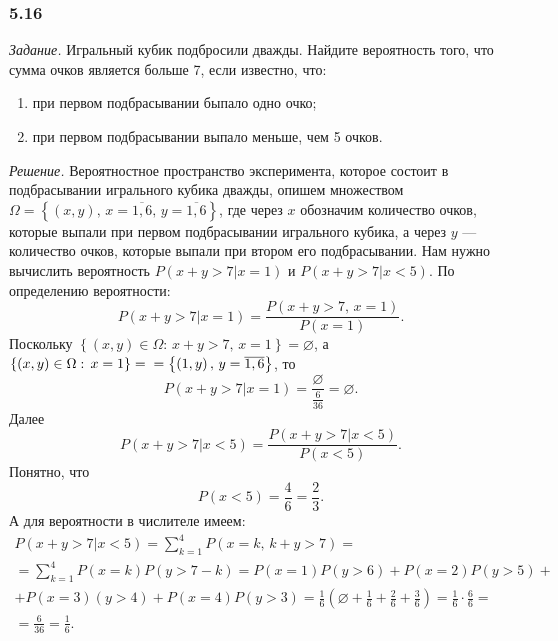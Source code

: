 \subsubsection*{5.16}

\textit{Задание.} Игральный кубик подбросили дважды.
Найдите вероятность того, что сумма очков является больше 7, если известно, что:

\begin{enumerate}[label=\alph*)]
\item при первом подбрасывании быпало одно очко;
\item при первом подбрасывании выпало меньше, чем 5 очков.
\end{enumerate}

\textit{Решение.}
Вероятностное пространство эксперимента,
которое состоит в подбрасывании игрального кубика дважды,
опишем множеством
$ \Omega =
\left\{ \left( x, y \right), \, x = \overline{1, 6}, \, y = \overline{1, 6} \right\} $,
где через $x$ обозначим количество очков,
которые выпали при первом подбрасывании игрального кубика, а через $y$ --- количество очков, которые выпали при втором его подбрасывании.
Нам нужно вычислить вероятность $P \left( \left. x+y>7 \right| x=1 \right) $ и $P \left( \left. x+y>7 \right| x<5 \right) $.
По определению вероятности:
$$P \left( \left. x+y>7 \right| x=1 \right) =
\frac{P \left( x+y>7, \, x=1 \right) }{P \left( x=1 \right) }.$$
Поскольку
$ \left\{ \left( x, y \right) \in \Omega: \, x + y > 7, \, x = 1 \right\} =
\varnothing $,
а $ \left\{ \left( x, y \right) \in \Omega: \, x = 1 \right\} =  \\ = \left\{ \left( 1, y \right), \, y = \overline{1, 6} \right\} $, то
$$P \left( \left. x+y>7 \right| x=1 \right) =
\frac{ \varnothing }{ \frac{6}{36} } =
\varnothing.$$
Далее
$$P \left( \left. x+y>7 \right| x<5 \right) =
\frac{P \left( \left. x+y>7 \right| x<5 \right) }{P \left( x<5 \right) }.$$
Понятно, что
$$P \left( x<5 \right) =
\frac{4}{6} =
\frac{2}{3}.$$
А для вероятности в числителе имеем:
\begin{equation*}
\begin{split}
P \left( \left. x+y>7 \right| x<5 \right) =
\sum \limits_{k=1}^4 P \left(x=k, \, k+y>7 \right) = \\
= \sum \limits_{k=1}^4 P \left( x=k \right) P \left( y>7-k \right) =
P \left( x=1 \right) P \left( y>6 \right) +
P \left( x=2 \right) P \left( y>5 \right) + \\
+ P \left( x=3 \right) \left( y>4 \right) +
P \left( x=4 \right) P \left( y>3 \right) =
\frac{1}{6} \left(\varnothing +\frac{1}{6} + \frac{2}{6} + \frac{3}{6} \right) =
\frac{1}{6} \cdot \frac{6}{6} = \\
= \frac{6}{36} =
\frac{1}{6}.
\end{split}
\end{equation*}

